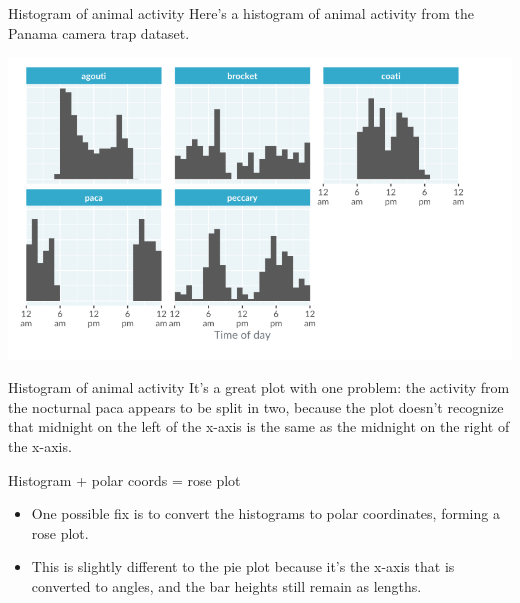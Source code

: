 \documentclass[
  ignorenonframetext,
]{beamer}
\begin{document}
\begin{frame}{Histogram of animal activity}
\label{histogram-of-animal-activity}
Here's a histogram of animal activity from the Panama camera trap
dataset.

\includegraphics{../images/im104.png}
\end{frame}

\begin{frame}{Histogram of animal activity}
\label{histogram-of-animal-activity-1}
It's a great plot with one problem: the activity from the nocturnal paca
appears to be split in two, because the plot doesn't recognize that
midnight on the left of the x-axis is the same as the midnight on the
right of the x-axis.
\end{frame}

\begin{frame}{Histogram + polar coords = rose plot}
\label{histogram-polar-coords-rose-plot}
\begin{itemize}
\item
  One possible fix is to convert the histograms to polar coordinates,
  forming a rose plot.
\item
  This is slightly different to the pie plot because it's the x-axis
  that is converted to angles, and the bar heights still remain as
  lengths.
\end{itemize}
\end{frame}
\end{document}
